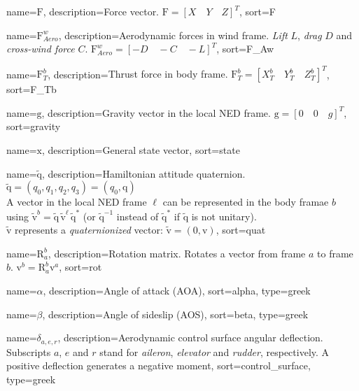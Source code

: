 {
	name={$\bm{\mathrm{F}}$},
	description={Force vector. $\bm{\mathrm{F}} = [X \quad Y \quad Z]^T$},
	sort=F
}

{
	name={$\bm{\mathrm{F}}_{Aero}^w$},
	description={Aerodynamic forces in wind frame. \textit{Lift} $L$, \textit{drag} $D$ and \textit{cross-wind force} $C$. $\bm{\mathrm{F}}_{Aero}^w = [-D \quad -C \quad -L]^T$},
	sort=F_Aw
}

{
	name={$\bm{\mathrm{F}}_T^b$},
	description={Thrust force in body frame. $\bm{\mathrm{F}}_T^b = [X_T^b \quad Y_T^b \quad Z_T^b]^T$},
	sort=F_Tb
}

{
	name={$\bm{\mathrm{g}}$},
	description={Gravity vector in the local NED frame. $\bm{\mathrm{g}} = [0 \quad 0 \quad g]^T$},
	sort=gravity
}

{
	name={$\bm{\mathrm{x}}$},
	description={General state vector},
	sort=state
}

{
	name={$\bm{\mathrm{\tilde{q}}}$},
	description={Hamiltonian attitude quaternion.
				 $\bm{\mathrm{\tilde{q}}} = (q_0, q_1, q_2, q_3) = (q_0, \bm{\mathrm{q}})$\\
				 A vector in the local NED frame $\ell$ can be represented in the body framae $b$ using
				 $\bm{\mathrm{\tilde{v}}}^b = \bm{\mathrm{\tilde{q}}} \, \bm{\mathrm{\tilde{v}}}^\ell \, \bm{\mathrm{\tilde{q}}}^*$ (or $\bm{\mathrm{\tilde{q}}}^{-1}$
				 instead of $\bm{\mathrm{\tilde{q}}}^*$ if $\bm{\mathrm{\tilde{q}}}$ is not unitary).\\
				 $\bm{\mathrm{\tilde{v}}}$ represents a \textit{quaternionized} vector: $\bm{\mathrm{\tilde{v}}} = (0,\bm{\mathrm{v}})$},
	sort=quat
}

{
	name={$\bm{\mathrm{R}}_a^b$},
	description={Rotation matrix. Rotates a vector from frame $a$ to frame $b$. $\bm{\mathrm{v}}^b = \bm{\mathrm{R}}_a^b \bm{\mathrm{v}}^a$},
	sort=rot
}

{
	name={$\alpha$},
	description={Angle of attack (AOA)},
	sort=alpha,
	type=greek
}

{
	name={$\beta$},
	description={Angle of sideslip (AOS)},
	sort=beta,
	type=greek
}

{
	name={$\delta_{a,e,r}$},
	description={Aerodynamic control surface angular deflection. Subscripts $a$, $e$ and $r$ stand for \textit{aileron}, \textit{elevator} and \textit{rudder}, respectively. A positive deflection generates a negative moment},
	sort=control_surface,
	type=greek
}

